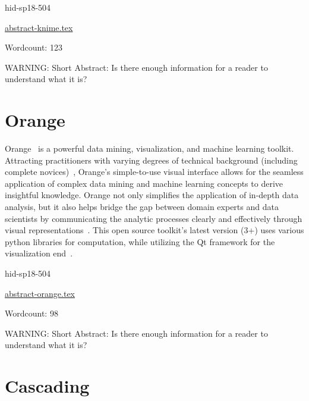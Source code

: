 \begin{IU}

hid-sp18-504

\href{https://github.com/cloudmesh-community/hid-sp18-504/blob/master//technology/abstract-knime.tex}{abstract-knime.tex}

 

Wordcount: 123

WARNING: Short Abstract: Is there enough information for a reader to understand what it is?

\end{IU}

\section{Orange}

Orange~\cite{hid-sp18-504-orange} is a powerful data mining, visualization, 
and machine learning toolkit. Attracting practitioners with varying degrees of
technical background (including complete novices)~\cite{hid-sp18-504-orange}, 
Orange's simple-to-use visual interface allows for the seamless application of 
complex data mining and machine learning concepts to derive insightful 
knowledge. Orange not only simplifies the application of in-depth data 
analysis, but it also helps bridge the gap between domain experts and 
data scientists by communicating the analytic processes clearly and 
effectively through visual representations~\cite{hid-sp18-504-orange}. 
This open source toolkit's latest version (3+) uses various python libraries 
for computation, while utilizing the Qt framework for the visualization 
end~\cite{hid-sp18-504-wiki-orange}.

\begin{IU}

hid-sp18-504

\href{https://github.com/cloudmesh-community/hid-sp18-504/blob/master//technology/abstract-orange.tex}{abstract-orange.tex}

 

Wordcount: 98

WARNING: Short Abstract: Is there enough information for a reader to understand what it is?

\end{IU}

\section{Cascading}


